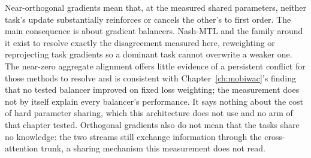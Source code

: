 Near-orthogonal gradients mean that, at the measured shared parameters, neither task's update
substantially reinforces or cancels the other's to first order. The
main consequence is about gradient balancers. Nash-MTL and the family around it exist to resolve exactly
the disagreement measured here, reweighting or reprojecting task gradients so a dominant task cannot
overwrite a weaker one. The near-zero aggregate alignment offers little evidence of a persistent
conflict for those methods to resolve and is consistent with Chapter~\ref{ch:mobiwac}'s finding that no
tested balancer improved on fixed loss weighting; the measurement does not by itself explain every
balancer's performance. It says nothing
about the cost of hard parameter sharing, which this architecture does not use and no arm of that chapter
tested. Orthogonal gradients also do not mean that the tasks share no knowledge: the two streams
still exchange information through the cross-attention trunk, a sharing mechanism this measurement
does not read.
